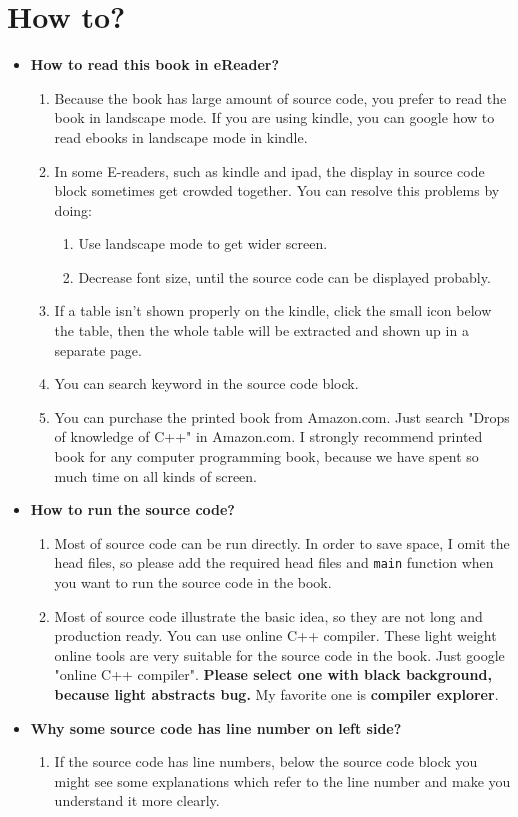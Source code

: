 \documentclass[a4paper,11pt,twoside]{book}
\begin{document}
\chapter*{How to?}
\begin{itemize}
	\item \textbf{How to read this book in eReader?}
	\begin{enumerate}
		\item Because the book has large amount of source code, you prefer to read the book in landscape mode. If you are using kindle, you can google how to read ebooks in landscape mode in kindle. 
		
		\item In some E-readers, such as kindle and ipad, the display in source code block sometimes get crowded together. You can resolve this problems by doing:
		\begin{enumerate}
			\item Use landscape mode to get wider screen.
			\item Decrease font size, until the source code can be displayed probably.
		\end{enumerate}
		
		\item If a table isn't shown properly on the kindle, click the small icon below the table, then the whole table will be extracted and shown up in a separate page. 
		
		\item You can search keyword in the source code block.
		
		\item You can purchase the printed book from Amazon.com. Just search "Drops of knowledge of C++" in Amazon.com. I strongly recommend printed book for any computer programming book, because we have spent so much time on all kinds of screen.
	\end{enumerate}

	\item \textbf{How to run the source code?}
	\begin{enumerate}
		\item Most of source code can be run directly. In order to save space, I omit the head files, so please add the required head files and \texttt{main} function when you want to run the source code in the book.
		
		\item Most of source code illustrate the basic idea, so they are not long and production ready. You can use online C++ compiler. These light weight online tools are very suitable for the source code in the book. Just google "online C++ compiler". \textbf{Please select one with black background, because light abstracts bug.} My favorite one is \textbf{compiler explorer}. 
	\end{enumerate}
	\item \textbf{Why some source code has line number on left side?}
	\begin{enumerate}
		\item If the source code has line numbers, below the source code block you might see some explanations which refer to the line number and make you understand it more clearly.


\end{enumerate}
\end{itemize}
\end{document}
